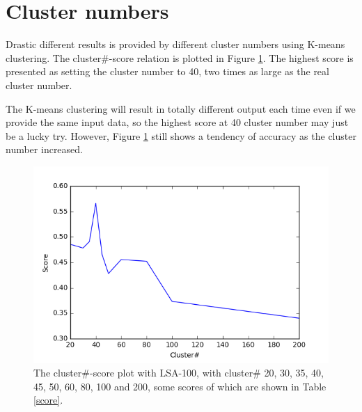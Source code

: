 \documentclass[12pt]{article}
\begin{document}
\section{Cluster numbers}
\par Drastic different results is provided by different
cluster numbers using K-means clustering. The
cluster\#-score relation is plotted in Figure \ref{cluster}.
The highest score is presented as setting the cluster
number to 40, two times as large as the real cluster number.
\par The K-means clustering will result in totally
different output each time even if we provide the
same input data, so the highest score at 40 cluster
number may just be a lucky try. However, Figure
\ref{cluster} still shows a tendency of accuracy as
the cluster number increased.
\begin{figure}
  \centering
  \includegraphics[width=0.75\linewidth]{cluster-score.png}
  \caption{The cluster\#-score plot with LSA-100,
  with cluster\# 20, 30, 35, 40,
  45, 50, 60, 80, 100 and 200, some scores of which are
  shown in Table \ref{score}.}
  \label{cluster}
\end{figure}
\end{document}
